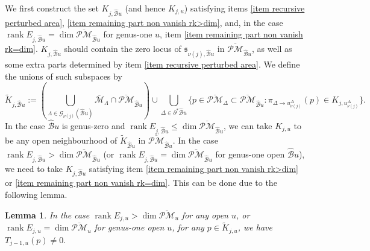 \documentclass[11pt]{amsart}
\newtheorem{lem}[dummy]{Lemma}
\theoremstyle{definition}
\theoremstyle{remark}
\newcommand{\oPMb}{{\overline{\mathcal{PM}}}}
\newcommand{\<}{\left<}
\renewcommand{\>}{\right>}
\numberwithin{equation}{section}
\DeclareMathOperator{\rk}{rank}
\def\Mbar{{\overline{\mathcal M}}}
\begin{document}
    We first construct the set $K_{j,\hat{\mathcal B}u}$ (and hence $K_{j,u}$) satisfying items \ref{item recursive perturbed area}, \ref{item remaining part non vanish rk>dim}, and, in the case $\rk E_{j,{\hat{\mathcal B}u}}=\dim \oPMb_{\hat{\mathcal B}u}$ for genus-one $u$, item \ref{item remaining part non vanish rk=dim}.  $K_{j,\hat{\mathcal B}u}$ should contain the zero locus of $\mathfrak {s}_{\nu(j),\hat{\mathcal B}u}$ in $\oPMb_{\hat{\mathcal B}u}$, as well as some extra parts determined by item \ref{item recursive perturbed area}. We define the unions of such subspaces by
    $$\tilde{K}_{j,\hat{\mathcal B}u}:=\left( \bigcup_{\Lambda\in \mathcal G_{\nu(j)}({\hat{\mathcal B}u})}\Mbar_\Lambda\cap \oPMb_{\hat{\mathcal B}u}\right)\cup \bigcup_{\Delta \in \partial^* {\hat{\mathcal B}u}}\{p\in \oPMb_\Delta\subset \oPMb_{\hat{\mathcal B}u} \colon \pi_{\Delta \to u^{\Delta}_{\nu(j)}}(p)\in K_{j,u^{\Delta}_{\nu(j)}}\}.$$
    In the case ${\hat{\mathcal B}u}$ is genus-zero and $\rk E_{j,{\hat{\mathcal B}u}}\le \dim \oPMb_{\hat{\mathcal B}u}$, we can take $K_{j,u}$ to be any open neighbourhood of $\tilde{K}_{\hat{\mathcal B}u}$ in $\oPMb_{\hat{\mathcal B}u}$. In the case $\rk E_{j,{\hat{\mathcal B}u}}> \dim \oPMb_{\hat{\mathcal B}u}$ (or $\rk E_{j,{\hat{\mathcal B}u}}= \dim \oPMb_{\hat{\mathcal B}u}$ for genus-one open ${\hat{\mathcal B}u}$), we need to take $K_{j,\hat{\mathcal B}u}$ satisfying item \ref{item remaining part non vanish rk>dim} or \ref{item remaining part non vanish rk=dim}. This can be done due to the following lemma. 
    \begin{lem}
        In the case $\rk E_{j,u}> \dim \oPMb_u$ for any open $u$, or $\rk E_{j,u}= \dim \oPMb_u$ for genus-one open $u$, for any $p\in \tilde{K}_{j,u}$, we have 
        $T_{j-1,u}(p) \ne 0.$
    \end{lem}
\end{document}
